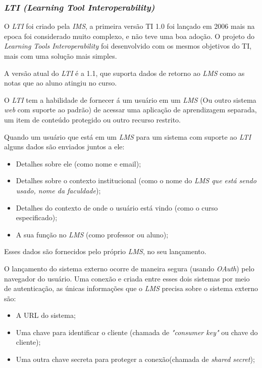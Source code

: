 \subsubsection{\textit{LTI (Learning Tool Interoperability)}}
O \textit{LTI} foi criado pela \textit{IMS}, a primeira versão TI 1.0 foi lançado em 2006 mais na epoca foi considerado muito complexo, e não teve uma boa adoção. O projeto do \textit{Learning Tools Interoperability} foi desenvolvido com os mesmos objetivos do TI, mais com uma solução mais simples. \cite{ims}
\par
A versão atual do \textit{LTI} é a 1.1, que suporta dados de retorno ao \textit{LMS} como as notas que ao aluno atingiu no curso.
\par
\begin{citacao}
  O \textit{LTI} tem a habilidade de fornecer á um usuário em um \textit{LMS} (Ou outro sistema \textit{web} com suporte ao padrão) de acessar uma aplicação de aprendizagem separada, um item de conteúdo protegido ou outro recurso restrito. \cite[p.~2, tradução nossa]{vickers-ims}
\end{citacao}
\par
Quando um usuário que está em um \textit{LMS} para um sistema com suporte ao \textit{LTI} alguns dados são enviados juntos a ele:
\begin{itemize}
    \item Detalhes sobre ele (como nome e email);
    \item Detalhes sobre o contexto institucional (como o nome do \textit{LMS que está sendo usado, nome da faculdade});
    \item Detalhes do contexto de onde o usuário está vindo (como o curso especificado);
    \item A sua função no \textit{LMS} (como professor ou aluno);
\end{itemize}
Esses dados são fornecidos pelo próprio \textit{LMS}, no seu lançamento.
\par
O lançamento do sistema externo ocorre de maneira segura (usando \textit{OAuth}) pelo navegador do usuário. Uma conexão e criada entre esses dois sistemas por meio de autenticação, as únicas informações que o \textit{LMS} precisa sobre o sistema externo são:
\begin{itemize}
    \item A \ac{URL} do sistema;
    \item Uma chave para identificar o cliente (chamada de \textit{"consumer key"} ou chave do cliente);
    \item Uma outra chave secreta para proteger a conexão(chamada de \textit{shared secret});
\end{itemize}

